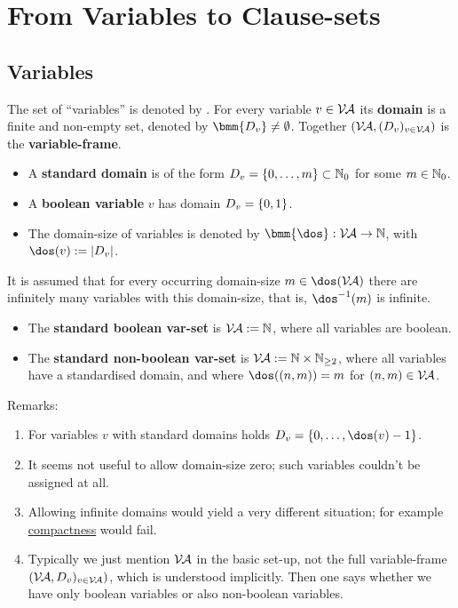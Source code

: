 \documentclass[12pt]{book}
\begin{document}
\chapter{From Variables to Clause-sets}
\label{cha:vartocls}

\section{Variables}
\label{sec:Variables}


\begin{defi}\label{def:var}
  The set of ``variables'' is denoted by \bmm{\Va}. For every variable $v \in \mathcal{V\hspace{-0.1em}A}$ its \textbf{domain} is a finite and non-empty set, denoted by $\bmm{D_v} \ne \es$. Together $(\mathcal{V\hspace{-0.1em}A}, (D_v)_{v \in \mathcal{V\hspace{-0.1em}A}})$ is the \textbf{variable-frame}.
  \begin{itemize}
  \item A \textbf{standard domain} is of the form $D_v = \{ 0, \dots, m \} \subset \mathbb{N}_0$ for some $m \in \mathbb{N}_0$.
  \item A \textbf{boolean variable} $v$ has domain $D_v = \{ 0,1 \}$.
  \item The domain-size of variables is denoted by $\bmm{\dos}: \Va \ra \NN$, with $\dos(v) := \abs{D_v}$.
  \end{itemize}
  It is assumed that for every occurring domain-size $m \in \dos(\Va)$ there are infinitely many variables with this domain-size, that is, $\dos^{-1}(m)$ is infinite.
  \begin{itemize}
  \item The \textbf{standard boolean var-set} is $\mathcal{V\hspace{-0.1em}A} := \mathbb{N}$, where all variables are boolean.
  \item The \textbf{standard non-boolean var-set} is $\mathcal{V\hspace{-0.1em}A} := \mathbb{N} \times \mathbb{N}_{\ge2}$, where all variables have a standardised domain, and where $\dos((n,m)) = m$ for $(n,m) \in \mathcal{V\hspace{-0.1em}A}$.
  \end{itemize}
\end{defi}
Remarks:
\begin{enumerate}
\item For variables $v$ with standard domains holds $D_v = \tb{0}{\dos(v)-1}$.
\item It seems not useful to allow domain-size zero; such variables couldn't be assigned at all.
\item Allowing infinite domains would yield a very different situation; for example \href{https://en.wikipedia.org/wiki/Compact_space}{compactness} would fail.
\item Typically we just mention $\mathcal{V\hspace{-0.1em}A}$ in the basic set-up, not the full variable-frame $(\mathcal{V\hspace{-0.1em}A},
D_v)_{v \in \mathcal{V\hspace{-0.1em}A}})$, which is understood implicitly. Then one says whether we have only boolean variables or also non-boolean variables.
\end{enumerate}
\end{document}
